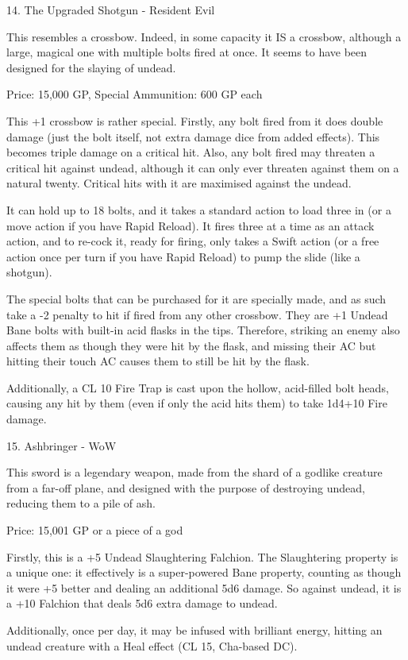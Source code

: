 \begin{multicols}{2}
14. The Upgraded Shotgun - Resident Evil

This resembles a crossbow. Indeed, in some capacity it IS a crossbow, although a large, magical one with multiple bolts fired at once. It seems to have been designed for the slaying of undead.

Price: 15,000 GP, Special Ammunition: 600 GP each

This +1 crossbow is rather special. Firstly, any bolt fired from it does double damage (just the bolt itself, not extra damage dice from added effects). This becomes triple damage on a critical hit. Also, any bolt fired may threaten a critical hit against undead, although it can only ever threaten against them on a natural twenty. Critical hits with it are maximised against the undead.

It can hold up to 18 bolts, and it takes a standard action to load three in (or a move action if you have Rapid Reload). It fires three at a time as an attack action, and to re-cock it, ready for firing, only takes a Swift action (or a free action once per turn if you have Rapid Reload) to pump the slide (like a shotgun).

The special bolts that can be purchased for it are specially made, and as such take a -2 penalty to hit if fired from any other crossbow. They are +1 Undead Bane bolts with built-in acid flasks in the tips. Therefore, striking an enemy also affects them as though they were hit by the flask, and missing their AC but hitting their touch AC causes them to still be hit by the flask.

Additionally, a CL 10 Fire Trap is cast upon the hollow, acid-filled bolt heads, causing any hit by them (even if only the acid hits them) to take 1d4+10 Fire damage.


15. Ashbringer - WoW

This sword is a legendary weapon, made from the shard of a godlike creature from a far-off plane, and designed with the purpose of destroying undead, reducing them to a pile of ash.

Price: 15,001 GP or a piece of a god

Firstly, this is a +5 Undead Slaughtering Falchion.
The Slaughtering property is a unique one: it effectively is a super-powered Bane property, counting as though it were +5 better and dealing an additional 5d6 damage.
So against undead, it is a +10 Falchion that deals 5d6 extra damage to undead.

Additionally, once per day, it may be infused with brilliant energy, hitting an undead creature with a Heal effect (CL 15, Cha-based DC).


\end{multicols}
